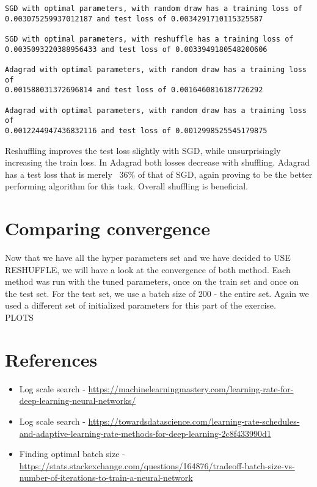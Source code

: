 \documentclass[12pt]{scrartcl}
\begin{document}
\begin{verbatim}
SGD with optimal parameters, with random draw has a training loss of 
0.003075259937012187 and test loss of 0.0034291710115325587

SGD with optimal parameters, with reshuffle has a training loss of 
0.0035093220388956433 and test loss of 0.0033949180548200606

Adagrad with optimal parameters, with random draw has a training loss of 
0.001588031372696814 and test loss of 0.0016460816187726292

Adagrad with optimal parameters, with random draw has a training loss of 
0.0012244947436832116 and test loss of 0.0012998525545179875
\end{verbatim}
Reshuffling improves the test loss slightly with SGD, while unsurprisingly increasing the train loss. In Adagrad both losses decrease with shuffling. Adagrad has a test loss that is merely ~36\% of that of SGD, again proving to be the better performing algorithm for this task. Overall shuffling is beneficial.

\section{Comparing convergence}
Now that we have all the hyper parameters set and we have decided to USE RESHUFFLE, we will have a look at the convergence of both method. Each method was run with the tuned parameters, once on the train set and once on the test set. For the test set, we use a batch size of 200 - the entire set. Again we used a different set of initialized parameters for this part of the exercise.\\
PLOTS\\

\section{References}
\begin{itemize}
\item Log scale search - \url{https://machinelearningmastery.com/learning-rate-for-deep-learning-neural-networks/}

\item Log scale search - \url{https://towardsdatascience.com/learning-rate-schedules-and-adaptive-learning-rate-methods-for-deep-learning-2c8f433990d1}

\item Finding optimal batch size - \url{https://stats.stackexchange.com/questions/164876/tradeoff-batch-size-vs-number-of-iterations-to-train-a-neural-network}
\end{itemize}
\end{document}
